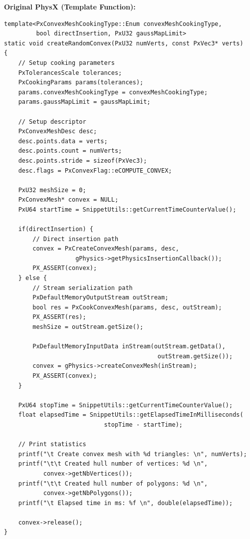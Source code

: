 \textbf{Original PhysX (Template Function):}
\begin{lstlisting}[caption={Original: Template-based cooking with compile-time config}]
template<PxConvexMeshCookingType::Enum convexMeshCookingType,
         bool directInsertion, PxU32 gaussMapLimit>
static void createRandomConvex(PxU32 numVerts, const PxVec3* verts)
{
    // Setup cooking parameters
    PxTolerancesScale tolerances;
    PxCookingParams params(tolerances);
    params.convexMeshCookingType = convexMeshCookingType;
    params.gaussMapLimit = gaussMapLimit;

    // Setup descriptor
    PxConvexMeshDesc desc;
    desc.points.data = verts;
    desc.points.count = numVerts;
    desc.points.stride = sizeof(PxVec3);
    desc.flags = PxConvexFlag::eCOMPUTE_CONVEX;

    PxU32 meshSize = 0;
    PxConvexMesh* convex = NULL;
    PxU64 startTime = SnippetUtils::getCurrentTimeCounterValue();

    if(directInsertion) {
        // Direct insertion path
        convex = PxCreateConvexMesh(params, desc,
                    gPhysics->getPhysicsInsertionCallback());
        PX_ASSERT(convex);
    } else {
        // Stream serialization path
        PxDefaultMemoryOutputStream outStream;
        bool res = PxCookConvexMesh(params, desc, outStream);
        PX_ASSERT(res);
        meshSize = outStream.getSize();

        PxDefaultMemoryInputData inStream(outStream.getData(),
                                           outStream.getSize());
        convex = gPhysics->createConvexMesh(inStream);
        PX_ASSERT(convex);
    }

    PxU64 stopTime = SnippetUtils::getCurrentTimeCounterValue();
    float elapsedTime = SnippetUtils::getElapsedTimeInMilliseconds(
                            stopTime - startTime);

    // Print statistics
    printf("\t Create convex mesh with %d triangles: \n", numVerts);
    printf("\t\t Created hull number of vertices: %d \n",
           convex->getNbVertices());
    printf("\t\t Created hull number of polygons: %d \n",
           convex->getNbPolygons());
    printf("\t Elapsed time in ms: %f \n", double(elapsedTime));

    convex->release();
}
\end{lstlisting}

